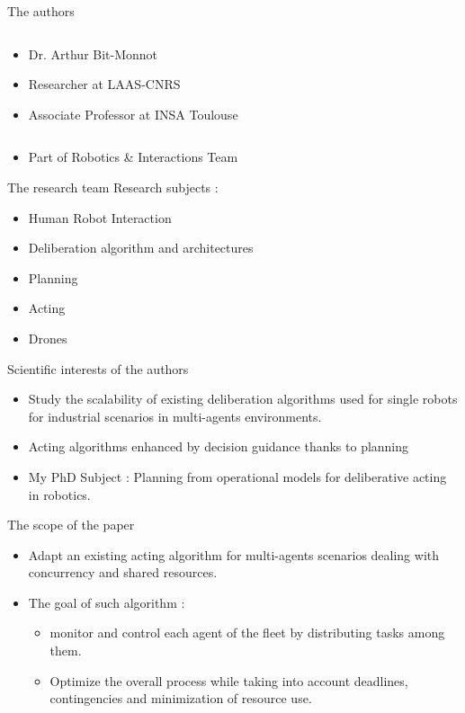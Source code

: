 \begin{frame}{The authors}
\begin{columns}
\begin{column}{0.5\textwidth}
            \begin{itemize}
                \item Dr. Arthur Bit-Monnot
                \item Researcher at LAAS-CNRS
                \item Associate Professor at INSA Toulouse
            \end{itemize}
        \end{column}
    \end{columns}
\centering
    \begin{itemize}
        \item Part of Robotics \& Interactions Team
    \end{itemize}
\end{frame}

\begin{frame}{The research team}
    Research subjects :
    \begin{itemize}
        \item Human Robot Interaction
        \item Deliberation algorithm and architectures
        \item Planning
        \item Acting
        \item Drones
    \end{itemize}
\end{frame}

\begin{frame}{Scientific interests of the authors}
\begin{itemize}
    \item Study the scalability of existing deliberation algorithms used for single robots for industrial scenarios in multi-agents environments.
    \item Acting algorithms enhanced by decision guidance thanks to planning
    \item My PhD Subject : Planning from operational models for deliberative acting in robotics.
\end{itemize}

\end{frame}

\begin{frame}{The scope of the paper}
    \begin{itemize}
        \item Adapt an existing acting algorithm for multi-agents scenarios dealing with concurrency and shared resources.
        \item The goal of such algorithm :
        \begin{itemize}
            \item monitor and control each agent of the fleet by distributing tasks among them.
            \item Optimize the overall process while taking into account deadlines, contingencies and minimization of resource use.
        \end{itemize}
    \end{itemize}
\end{frame}